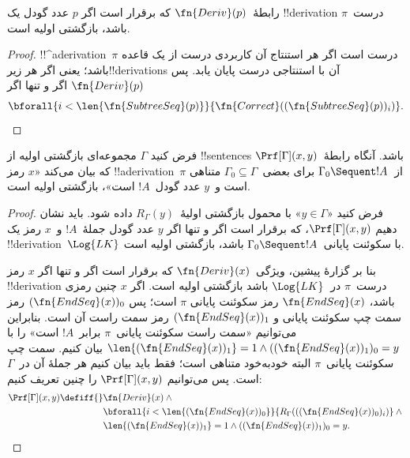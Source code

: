 \documentclass[../../../include/open-logic-section]{subfiles}
\begin{document}
\begin{prop}
  رابطهٔ~$\fn{Deriv}(p)$ که برقرار است اگر $p$ عدد گودل یک
  !!{derivation} درست~$\pi$ باشد، بازگشتی اولیه است.
\end{prop}

\begin{proof}
  !!^a{derivation}~$\pi$ درست است اگر هر استنتاج آن کاربردی درست از یک
  قاعده باشد؛ یعنی اگر هر زیر!!{derivation}s آن با استنتاجی درست پایان
  یابد. پس $\fn{Deriv}(p)$ اگر و تنها اگر
  \[
  \bforall{i<\len{\fn{SubtreeSeq}(p)}}{\fn{Correct}((\fn{SubtreeSeq}(p))_i)}.
  \]
\end{proof}


\begin{prop}
فرض کنید $\Gamma$ مجموعه‌ای بازگشتی اولیه از !!{sentence}s باشد. آنگاه
رابطهٔ~$\Prf[\Gamma](x,y)$ که بیان می‌کند «$x$ رمز !!a{derivation}~$\pi$
از~$\Gamma_0\Sequent !A$ برای بعضی~$\Gamma_0\subseteq\Gamma$ متناهی
است و~$y$ عدد گودل~$!A$ است»، بازگشتی اولیه است.
\end{prop}

\begin{proof}
فرض کنید «$y\in\Gamma$» با محمول بازگشتی اولیهٔ~$R_\Gamma(y)$ داده
شود. باید نشان دهیم $\Prf[\Gamma](x,y)$، که برقرار است اگر و تنها اگر
$y$ عدد گودل جملهٔ~$!A$ و~$x$ رمز یک !!{derivation}~$\Log{LK}$ با
سکوئنت پایانی~$\Gamma_0\Sequent !A$ باشد، بازگشتی اولیه است.

بنا بر گزارهٔ پیشین، ویژگی~$\fn{Deriv}(x)$ که برقرار است اگر و تنها
اگر $x$ رمز !!{derivation} درست~$\pi$ در~$\Log{LK}$ باشد بازگشتی اولیه
است. اگر $x$ چنین رمزی باشد، $\fn{EndSeq}(x)$ رمز سکوئنت پایانی
$\pi$ است؛ پس $(\fn{EndSeq}(x))_0$ رمز سمت چپ سکوئنت پایانی و
$(\fn{EndSeq}(x))_1$ رمز سمت راست آن است. بنابراین می‌توانیم
«سمت راست سکوئنت پایانی~$\pi$ برابر~$!A$ است» را با
$\len{(\fn{EndSeq}(x))_1}=1\land
((\fn{EndSeq}(x))_1)_0=y$ بیان کنیم. سمت چپ سکوئنت پایانی~$\pi$
البته خودبه‌خود متناهی است؛ فقط باید بیان کنیم هر جملهٔ آن در~$\Gamma$
است. پس می‌توانیم $\Prf[\Gamma](x,y)$ را چنین تعریف کنیم:
\begin{align*}
\Prf[\Gamma](x, y) \defiff {}&
\fn{Deriv}(x) \land {} \\
& \bforall{i <
  \len{(\fn{EndSeq}(x))_0}}{R_\Gamma(((\fn{EndSeq}(x))_0)_i)} \land {}\\
& \len{(\fn{EndSeq}(x))_1} = 1 \land ((\fn{EndSeq}(x))_1)_0 = y.
\end{align*}
\end{proof}
\end{document}
